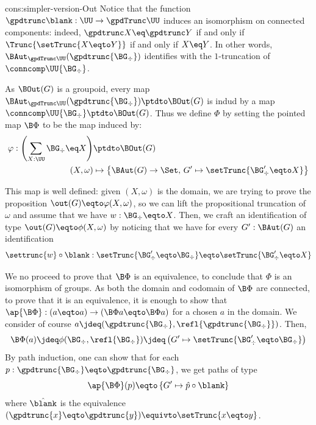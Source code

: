\begin{implementation}{cons:simpler-version-Out}
  Notice that the function $\gpdtrunc \blank : \UU \to \gpdTrunc\UU$ induces
  an isomorphism on connected components: indeed,
  $\gpdtrunc X \eq \gpdtrunc Y$ if and only if $\Trunc{\setTrunc{X \eqto Y}}$
  if and only if $X \eq Y$. In other words,
  $\BAut_{\gpdTrunc\UU}(\gpdtrunc{\BG_\div})$ identifies with the
  $1$-truncation of $\conncomp\UU{\BG_\div}$.

  As $\BOut(G)$ is a groupoid, every map
  $\BAut_{\gpdTrunc\UU}(\gpdtrunc{\BG_\div}) \ptdto \BOut(G)$ is indud by a map
  $\conncomp\UU{\BG_\div} \ptdto \BOut(G)$. Thus we define $\Phi$ by setting the
  pointed map $\B\Phi$ to be the map induced by:
  \begin{align*}
    \varphi:
    \left(\sum_{X:\UU}\BG_\div \eq X\right) &\ptdto \BOut(G) \\
    (X,\omega) &\mapsto \left\{
      \BAut(G) \to \Set, \, G' \mapsto \setTrunc{\BG'_\div \eqto X}
      \right\}
  \end{align*}
  
  This map is well defined: given $(X,\omega)$ is the domain, we are trying to
  prove the proposition $\out(G) \eqto  \varphi(X,\omega)$, so we can lift the
  propositional truncation of $\omega$ and assume that we have
  $w:\BG_\div \eqto X$. Then, we craft an identification of type
  $\out(G) \eqto \phi(X,\omega)$ by noticing that we have for every
  $G':\BAut(G)$ an identification
  \begin{displaymath}
    \settrunc{w} \circ \blank : \setTrunc{\BG'_\div \eqto \BG_\div} \eqto \setTrunc{\BG'_\div \eqto X}
  \end{displaymath}
  
  We no proceed to prove that $\B\Phi$ is an equivalence, to conclude that
  $\Phi$ is an isomorphism of groups. As both the domain and codomain of
  $\B\Phi$ are connected, to prove that it is an equivalence, it is enough to
  show that $\ap {\B\Phi}: (a \eqto a) \to (\B\Phi a \eqto \B\Phi a)$ for a
  chosen $a$ in the domain. We consider of course
  $a \jdeq (\gpdtrunc{\BG_\div},\refl{\gpdtrunc{\BG_\div}})$. Then,
  \begin{displaymath}
    \B\Phi(a) \jdeq \phi(\BG_\div,\refl{\BG_\div}) \jdeq  \left(
      G' \mapsto \setTrunc{\BG'_\div \eqto \BG_\div}
    \right)
  \end{displaymath}
  By path induction, one can show that for each
  $p:\gpdtrunc{\BG_\div} \eqto \gpdtrunc{\BG_\div}$, we get paths of type
  \begin{displaymath}
    \ap{\B\Phi} (p) \eqto \left\{
      G' \mapsto \hat p \circ \blank
    \right\}
  \end{displaymath}
  where $\hat \blank$ is the equivalence
  $(\gpdtrunc{x} \eqto \gpdtrunc{y}) \equivto \setTrunc{x \eqto y}$.


\end{implementation}
